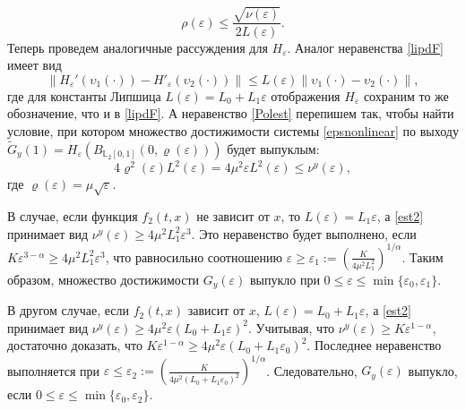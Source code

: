 \documentclass[../main.tex]{subfiles}
\begin{document}
	\begin{equation}\label{Polest}
		\rho(\varepsilon) \leqslant \frac{\sqrt{\nu(\varepsilon)}}{2L(\varepsilon)}.
	\end{equation}
	Теперь проведем аналогичные рассуждения для $ H_{\varepsilon} $. Аналог неравенства \eqref{lipdF}  имеет вид
	\begin{equation*}
		\left\| H_{\varepsilon}'(\upsilon_1(\cdot)) - H'_{\varepsilon}(\upsilon_2(\cdot)) \right\| \leqslant L(\varepsilon) \left\| \upsilon_1(\cdot) - \upsilon_2(\cdot)\right\|,
	\end{equation*}
	где для константы Липшица $ L(\varepsilon) = L_0 + L_1 \varepsilon$ отображения $ H_{\varepsilon} $ сохраним то же обозначение, что и в \eqref{lipdF}.
	А неравенство \eqref{Polest} перепишем так, чтобы найти условие, при котором множество достижимости системы \eqref{epsnonlinear} по выходу $ \widetilde{G}_y(1) = H_{\varepsilon} (B_{\mathbb{L}_2[0,1]}(0,\varrho(\varepsilon)))$ будет выпуклым:
	\begin{equation}\label{est2}
		4\varrho^2(\varepsilon)L^2(\varepsilon) = 4\mu^2\varepsilon L^2(\varepsilon) \leqslant \nu^y(\varepsilon),
	\end{equation}
	где $ \varrho(\varepsilon)  = \mu\sqrt{\varepsilon} $.
	
	В случае, если функция $ f_2(t,x) $ не зависит от $ x $, то $ L(\varepsilon) = L_1 \varepsilon  $, а \eqref{est2} принимает вид $ \nu^y(\varepsilon) \geqslant 4\mu^2L_1^2 \varepsilon^3 $.  Это неравенство будет выполнено, если $ K\varepsilon^{3 - \alpha} \geqslant 4\mu^2L_1^2 \varepsilon^3 $, что равносильно соотношению $ \varepsilon \geqslant \varepsilon_1 := \left(\frac{K}{4\mu^2L_1^2}\right)^{1/\alpha} $.  Таким образом, множество достижимости $ G_y(\varepsilon)$ выпукло при $ 0 \leqslant \varepsilon \leqslant \min\{\varepsilon_0,\varepsilon_1\}  $.  
	
	В другом случае, если $ f_2(t,x) $ зависит от $ x $, $ L(\varepsilon) =L_0+L_1\varepsilon $, а \eqref{est2} принимает вид $ \nu^y(\varepsilon) \geqslant 4\mu^2 \varepsilon (L_0 + L_1 \varepsilon)^2 $.  Учитывая, что $ \nu^y(\varepsilon)  \geqslant K \varepsilon^{1-\alpha} $, достаточно доказать, что $ K \varepsilon^{1-\alpha}  \geqslant 4\mu^2 \varepsilon (L_0 + L_1 \varepsilon_0)^2 $. Последнее неравенство выполняется при $ \varepsilon \leqslant \varepsilon_2 := \left(\frac{K}{4\mu^2(L_0 + L_1\varepsilon_0)^2} \right)^{1/\alpha} $. Следовательно, $ G_y(\varepsilon) $ выпукло, если $ 0 \leqslant \varepsilon \leqslant \min\{\varepsilon_0, \varepsilon_2\} $.
	
\end{document}
